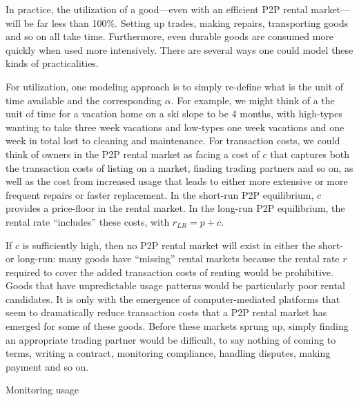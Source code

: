 
In practice, the utilization of a good---even with an efficient P2P rental market---will be far less than 100\%.
Setting up trades, making repairs, transporting goods and so on all take time.  
Furthermore, even durable goods are consumed more quickly when used more intensively. 
There are several ways one could model these kinds of practicalities. 

For utilization, one modeling approach is to simply re-define what is the unit of time available and the corresponding $\alpha$. 
For example, we might think of a the unit of time for a vacation home on a ski slope to be 4 months, with high-types wanting to take three week vacations and low-types one week vacations and one week in total lost to cleaning and maintenance.      
For transaction costs, we could think of owners in the P2P rental market as facing a cost of $c$ that captures both the transaction costs of listing on a market, finding trading partners and so on, as well as the cost from increased usage that leads to either more extensive or more frequent repairs or faster replacement.
In the short-run P2P equilibrium, $c$ provides a price-floor in the rental market.  
In the long-run P2P equilibrium, the rental rate ``includes'' these costs, with $r_{LR} = p + c$. 

If $c$ is sufficiently high, then no P2P rental market will exist in either the short- or long-run: 
many goods have ``missing'' rental markets because the rental rate $r$ required to cover the added transaction costs of renting would be prohibitive.
Goods that have unpredictable usage patterns would be particularly poor rental candidates.  
It is only with the emergence of computer-mediated platforms that seem to dramatically reduce transaction costs that a P2P rental market has emerged for some of these goods. 
Before these markets sprung up, simply finding an appropriate trading partner would be difficult, to say nothing of coming to terms, writing a contract, monitoring compliance, handling disputes, making payment and so on. 



Monitoring usage 
